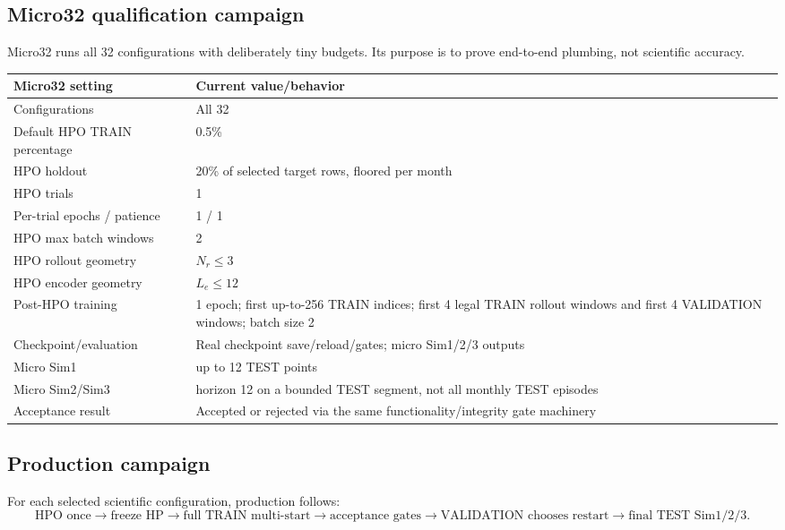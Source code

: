 \documentclass[11pt]{article}
\begin{document}
\subsection{Micro32 qualification campaign}
Micro32 runs all 32 configurations with deliberately tiny budgets. Its purpose is to prove end-to-end plumbing, not scientific accuracy.

\begin{table}[h]
\centering
\begin{tabularx}{\textwidth}{L{0.30\textwidth}Y}
\toprule
\textbf{Micro32 setting} & \textbf{Current value/behavior} \\
\midrule
Configurations & All 32 \\
Default HPO TRAIN percentage & 0.5\% \\
HPO holdout & 20\% of selected target rows, floored per month \\
HPO trials & 1 \\
Per-trial epochs / patience & 1 / 1 \\
HPO max batch windows & 2 \\
HPO rollout geometry & $N_r\le 3$ \\
HPO encoder geometry & $L_e\le 12$ \\
Post-HPO training & 1 epoch; first up-to-256 TRAIN indices; first 4 legal TRAIN rollout windows and first 4 VALIDATION windows; batch size 2 \\
Checkpoint/evaluation & Real checkpoint save/reload/gates; micro Sim1/2/3 outputs \\
Micro Sim1 & up to 12 TEST points \\
Micro Sim2/Sim3 & horizon 12 on a bounded TEST segment, not all monthly TEST episodes \\
Acceptance result & Accepted or rejected via the same functionality/integrity gate machinery \\
\bottomrule
\end{tabularx}
\end{table}

\subsection{Production campaign}
For each selected scientific configuration, production follows:
\[
\boxed{\text{HPO once}}\rightarrow
\boxed{\text{freeze HP}}\rightarrow
\boxed{\text{full TRAIN multi-start}}\rightarrow
\boxed{\text{acceptance gates}}\rightarrow
\boxed{\text{VALIDATION chooses restart}}\rightarrow
\boxed{\text{final TEST Sim1/2/3}}.
\]
\end{document}
